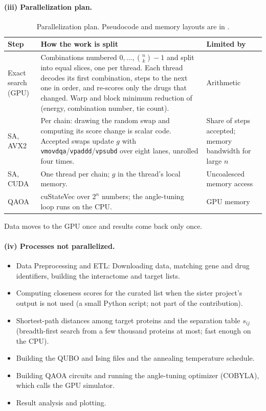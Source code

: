 \paragraph{(iii) Parallelization plan.}

\begin{table}[ht]
\centering
\small
\begin{tabularx}{\linewidth}{>{\raggedright\arraybackslash}p{2.9cm}X>{\raggedright\arraybackslash}p{2.3cm}}
\toprule
Step & How the work is split & Limited by \\
\midrule
Exact search (GPU) & Combinations numbered $0,\dots,\binom{n}{k}-1$ and split into equal slices, one per thread. Each thread decodes its first combination, steps to the next one in order, and re-scores only the drugs that changed. Warp and block minimum reduction of (energy, combination number, tie count). & Arithmetic \\
SA, AVX2 & Per chain: drawing the random swap and computing its score change is scalar code. Accepted swaps update $g$ with \texttt{vmovdqa}/\texttt{vpaddd}/\texttt{vpsubd} over eight lanes, unrolled four times. & Share of steps accepted; memory bandwidth for large $n$ \\
SA, CUDA & One thread per chain; $g$ in the thread's local memory. & Uncoalesced memory access \\
QAOA & cuStateVec over $2^n$ numbers; the angle-tuning loop runs on the CPU. & GPU memory \\
\bottomrule
\end{tabularx}
\caption{Parallelization plan. Pseudocode and memory layouts are in .}
\label{tab:parplan}
\end{table}

Data moves to the GPU once and results come back only once.

\paragraph{(iv) Processes not parallelized.}
\begin{itemize}
\item Data Preprocessing and ETL: Downloading data, matching gene and drug identifiers, building the interactome and target lists.
\item Computing closeness scores for the curated list when the sister project's output is not used (a small Python script; not part of the contribution).
\item Shortest-path distances among target proteins and the separation table $s_{ij}$ (breadth-first search from a few thousand proteins at most; fast enough on the CPU).
\item Building the QUBO and Ising files and the annealing temperature schedule.
\item Building QAOA circuits and running the angle-tuning optimizer (COBYLA), which calls the GPU simulator.
\item Result analysis and plotting.
\end{itemize}

